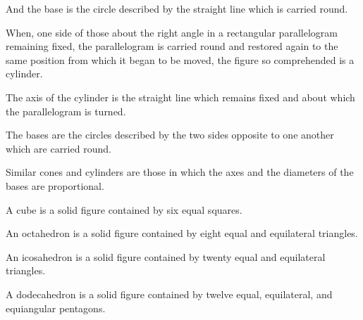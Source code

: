 \begin{scope}
\label{def:XI.20}
And the base is the circle described by the straight line which is
carried round.
\end{scope}

\begin{scope}
\label{def:XI.21}
When, one side of those about the right angle in a rectangular
parallelogram remaining fixed, the parallelogram is carried round and
restored again to the same position from which it began to be moved,
the figure so comprehended is a cylinder.
\end{scope}

\begin{scope}
\label{def:XI.22}
The axis of the cylinder is the straight line which remains fixed and
about which the parallelogram is turned.
\end{scope}

\begin{scope}
\label{def:XI.23}
The bases are the circles described by the two sides opposite to one
another which are carried round.
\end{scope}

\begin{scope}
\label{def:XI.24}
Similar cones and cylinders are those in which the axes and the
diameters of the bases are proportional.
\end{scope}

\begin{scope}
\label{def:XI.25}
A cube is a solid figure contained by six equal squares.
\end{scope}

\begin{scope}
\label{def:XI.26}
An octahedron is a solid figure contained by eight equal and
equilateral triangles.
\end{scope}

\begin{scope}
\label{def:XI.27}
An icosahedron is a solid figure contained by twenty equal and
equilateral triangles.
\end{scope}

\begin{scope}
\label{def:XI.28}
A dodecahedron is a solid figure contained by twelve equal,
equilateral, and equiangular pentagons.
\end{scope}


